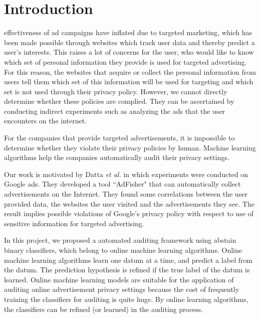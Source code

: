 \documentclass[12pt, journal]{IEEEtran}
\begin{document}
\section{Introduction}
% 
% 
% 
% 
 effectiveness of ad campaigns have inflated due to targeted marketing, which has been made possible through websites which track user data and thereby predict a user's interests. This raises a lot of concerns for the user, who would like to know which set of personal information they provide is used for targeted advertising. For this reason, the websites that acquire or collect the personal information from users tell them which set of this information will be used for targeting and which set is not used through their privacy policy. However, we cannot directly determine whether these policies are complied. They can be ascertained by conducting indirect experiments such as analyzing the ads that the user encounters on the internet. 
  
For the companies that provide targeted advertisements, it is impossible to determine whether they violate their privacy policies by human.
Machine learning algorithms help the companies automatically audit their privacy settings. 
 
Our work is motivated by Datta \textit{et al.} \cite{datta} in which experiments were conducted on Google ads. They developed a tool ``AdFisher" that  can automatically collect advertisements on the Internet. They found some correlations between the user provided data, the websites the user visited and the advertisements they see. The result implies possible violations of Google's privacy policy with respect to use of sensitive information for targeted advertising. 
 
 
In this project, we proposed a automated auditing framework using abstain binary classifiers, which belong to online machine learning algorithms.
Online machine learning algorithms learn one datum at a time, and predict a label from the datum.
The prediction hypothesis is refined if the true label of the datum is learned.
Online machine learning models are suitable for the application of auditing online advertisement privacy settings because the cost of frequently training the classifiers for auditing is quite huge.
By online learning algorithms, the classifiers can be refined (or learned) in the auditing process.
 
\end{document}
